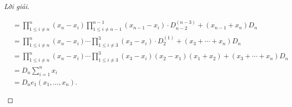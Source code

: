 \documentclass[class=nhvh-linear-algebra,crop=false]{standalone}
\begin{document}
\begin{proof}[Lời giải]
\begin{enumerate}[label = (\alph*)]
\begin{align*}
			       & = \prod^{n}_{1\le i\ne n}(x_{n} - x_{i})\prod^{n-1}_{1\le i\ne n-1}(x_{n-1} - x_{i})\cdot D^{(n-3)}_{n-2} + (x_{n-1} + x_{n})D_{n}                                                                                              \\
			       & = \prod^{n}_{1\le i\ne n}(x_{n} - x_{i})\cdots \prod^{3}_{1\le i\ne 3}(x_{3} - x_{i})\cdot D^{(1)}_{2} + (x_{3} + \cdots + x_{n})D_{n}                                                                                          \\
			       & = \prod^{n}_{1\le i\ne n}(x_{n} - x_{i})\cdots \prod^{3}_{1\le i\ne 3}(x_{3} - x_{i})(x_{2} - x_{1})(x_{1} + x_{2}) + (x_{3} + \cdots + x_{n})D_{n}                                                                             \\
			       & = D_{n}\sum^{n}_{i=1}x_{i}                                                                                                                                                                                                      \\
			       & = D_{n}e_{1}(x_{1},\ldots, x_{n}).
		      \end{align*}


\end{enumerate}
\end{proof}
\end{document}
